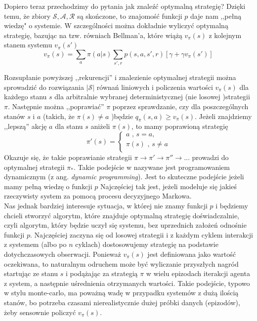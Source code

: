 \documentclass[licencjacka]{pracamgr}
\begin{document}
Dopiero teraz przechodzimy do pytania jak znaleźć optymalną strategię? Dzięki temu, że zbiory $\mathcal{S}, \mathcal{A}, \mathcal{R}$ są skończone, to znajomość funkcji $p$ daje nam  ,,pełną wiedzę" o systemie. W szczególności można dokładnie wyliczyć optymalną strategię, bazując na tzw. równiach Bellman'a, które wiążą $v_{\pi}(s)$ z kolejnym stanem systemu $v_{\pi}(s')$
$$v_{\pi}(s) = \sum_{a}\pi(a|s)\sum_{s',r}p(s,a,s',r)[\gamma +\gamma v_{\pi}(s')] $$

Rozsupłanie powyższej ,,rekurencji'' i znalezienie optymalnej strategii  można  sprowadzić  do rozwiązania $|\mathcal{S}|$  równań liniowych i policzenia wartości $v_{\pi}(s)$  dla każdego stanu $s$ dla arbitralnie wybranej deterministycznej (nie losowej )strategii $\pi$. Następnie można ,,poprawiać'' $\pi$ poprzez sprawdzanie, czy dla poszczególnych stanów $s$ i $a$ (takich, że $\pi(s)\neq a$ )będzie $q_{\pi}(s,a)\geq v_{\pi}(s)$. Jeżeli znajdziemy ,,lepszą'' akcję $a$  dla stanu $s$ aniżeli $\pi(s)$, to mamy poprawioną strategię 
$$\pi'(s) =
	\begin{cases}
		a\text{ ,  }s=a,\\			
		\pi(s)\text{ , } s\neq a\\
	\end{cases}
$$
 Okazuje się, że takie poprawianie strategii $\pi\rightarrow\pi'\rightarrow\pi''\rightarrow ...$ prowadzi do optymalnej strategii $\pi_{*}$. Takie podejście w \cite{RL} nazywane jest programowaniem dynamicznym (z ang. \textit{dynamic programming}). Jest to skuteczne podejście jeżeli mamy pełną wiedzę o funkcji $p$ Najczęściej tak jest, jeżeli modeluje się jakieś rzeczywisty system za pomocą procesu decyzyjnego Markowa.\\

Nas jednak bardziej interesuje sytuacja, w której nie znamy funkcji $p$ i będziemy chcieli stworzyć algorytm, które znajduje optymalną strategię doświadczalnie, czyli algorytm, który będzie uczył się systemu, bez uprzednich założeń odnośnie funkcji $p$. Najczęściej zaczyna się od losowej strategii i z każdym cyklem interakcji z systemem (albo po $n$ cyklach) dostosowujemy strategię na podstawie dotychczasowych obserwacji. Ponieważ $v_{\pi}(s)$ jest definiowana jako wartość oczekiwana, to naturalnym odruchem może być wyliczanie przyszłych nagród startując ze stanu $s$ i podążając za strategią $\pi$ w wielu epizodach iterakcji agenta z system, a następnie uśrednienia otrzymanych wartości. Takie podejście, typowo w stylu monte-carlo, ma poważną wadę w przypadku systemów z dużą ilością stanów, bo potrzeba czasami nierealistycznie dużej próbki danych (epizodów), żeby sensownie policzyć  $v_{\pi}(s)$. \\
 
\end{document}
